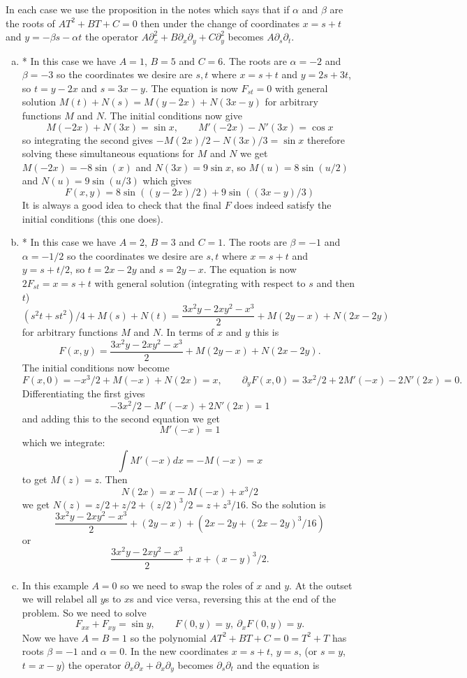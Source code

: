 \documentclass[12pt]{article}
\begin{document}
\iffalse
\begin{answer}
In each case we use the proposition in the notes which says that if $\alpha$ and $\beta$ are the roots of $AT^2+BT+C=0$ then under the change of coordinates $x=s+t$ and $y=-\beta s-\alpha t$ the operator $A\partial_x^2+B\partial_x\partial_y+C\partial_y^2$ becomes $A\partial_s\partial_t$.
\begin{enumerate}[(a)]
\item * In this case we have $A=1$, $B=5$ and $C=6$. The roots are $\alpha=-2$ and $\beta=-3$ so the coordinates we desire are $s,t$ where $x=s+t$ and $y=2s+3t$, so $t=y-2x$ and $s=3x-y$. The equation is now $F_{st}=0$ with general solution $M(t)+N(s)=M(y-2x)+N(3x-y)$ for arbitrary functions $M$ and $N$.
The initial conditions now give
\[M(-2x)+N(3x)=\sin x,\qquad M'(-2x)-N'(3x)=\cos x\]
so integrating the second gives $-M(2x)/2-N(3x)/3=\sin x$ therefore solving these simultaneous equations for $M$ and $N$ we get $M(-2x)=-8\sin(x)$ and $N(3x)=9\sin x$, so $M(u)=8\sin(u/2)$ and $N(u)=9\sin(u/3)$ which gives
\[F(x,y)=8\sin((y-2x)/2)+9\sin((3x-y)/3)\]
It is always a good idea to check that the final $F$ does indeed satisfy the initial conditions (this one does).
\item * In this case we have $A=2$, $B=3$ and $C=1$. The roots are $\beta=-1$ and $\alpha=-1/2$ so the coordinates we desire are $s,t$ where $x=s+t$ and $y=s+t/2$, so $t=2x-2y$ and $s=2y-x$. The equation is now $2F_{st}=x=s+t$ with general solution (integrating with respect to $s$ and then $t$)
\[(s^2t+st^2)/4+M(s)+N(t)=\frac{3x^2y-2xy^2-x^3}{2}+M(2y-x)+N(2x-2y)\]
for arbitrary functions $M$ and $N$.
In terms of $x$ and $y$ this is
\[F(x,y)=\frac{3x^2y-2xy^2-x^3}{2}+M(2y-x)+N(2x-2y).\]
The initial conditions now become
\[F(x,0)=-x^3/2+M(-x)+N(2x)=x,\qquad\partial_yF(x,0)=3x^2/2+2M'(-x)-2N'(2x)=0.\]
Differentiating the first gives
\[-3x^2/2-M'(-x)+2N'(2x)=1\]
and adding this to the second equation we get
\[M'(-x)=1\]
which we integrate:
\[\int M'(-x)dx=-M(-x)=x\]
to get $M(z)=z$. Then
\[N(2x)=x-M(-x)+x^3/2\]
we get $N(z)=z/2+z/2+(z/2)^3/2=z+z^3/16$. So the solution is
\[\frac{3x^2y-2xy^2-x^3}{2}+(2y-x)+(2x-2y+(2x-2y)^3/16)\]
or
\[\frac{3x^2y-2xy^2-x^3}{2}+x+(x-y)^3/2.\]
\item In this example $A=0$ so we need to swap the roles of $x$ and $y$. At the outset we will relabel all $y$s to $x$s and vice versa, reversing this at the end of the problem. So we need to solve
\[F_{xx}+F_{xy}=\sin y,\qquad F(0,y)=y,\ \partial_xF(0,y)=y.\]
Now we have $A=B=1$ so the polynomial $AT^2+BT+C=0=T^2+T$ has roots $\beta=-1$ and $\alpha=0$. In the new coordinates $x=s+t$, $y=s$, (or $s=y$, $t=x-y$) the operator $\partial_x\partial_x+\partial_x\partial_y$ becomes $\partial_s\partial_t$ and the equation is

\end{enumerate}
\end{answer}
\end{document}
